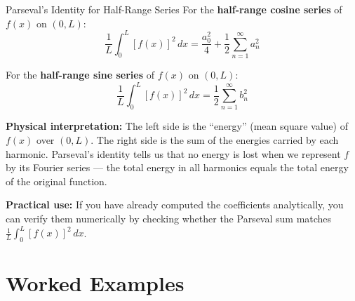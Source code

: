 \documentclass[12pt,a4paper]{article}
\begin{document}
\begin{infobox}{Parseval's Identity for Half-Range Series}
For the \textbf{half-range cosine series} of $f(x)$ on $(0,L)$:
\[
  \frac{1}{L}\int_0^L [f(x)]^2\,dx = \frac{a_0^2}{4} + \frac{1}{2}\sum_{n=1}^{\infty} a_n^2
\]

For the \textbf{half-range sine series} of $f(x)$ on $(0,L)$:
\[
  \frac{1}{L}\int_0^L [f(x)]^2\,dx = \frac{1}{2}\sum_{n=1}^{\infty} b_n^2
\]

\textbf{Physical interpretation:} The left side is the ``energy'' (mean square value) of $f(x)$ over $(0,L)$. The right side is the sum of the energies carried by each harmonic. Parseval's identity tells us that no energy is lost when we represent $f$ by its Fourier series --- the total energy in all harmonics equals the total energy of the original function.

\textbf{Practical use:} If you have already computed the coefficients analytically, you can verify them numerically by checking whether the Parseval sum matches $\frac{1}{L}\int_0^L [f(x)]^2\,dx$.
\end{infobox}

\section{Worked Examples}
\end{document}
